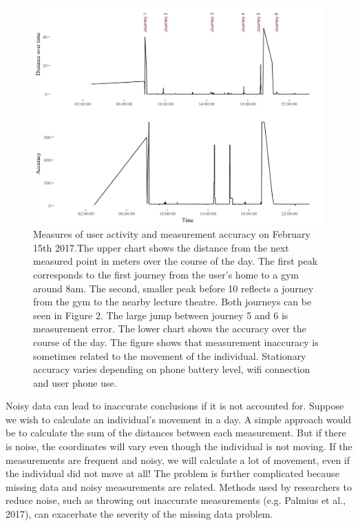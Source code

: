 \documentclass[man]{apa6}
\theoremstyle{definition}
\theoremstyle{definition}
\theoremstyle{definition}
\theoremstyle{remark}
\begin{document}
\begin{figure}
\includegraphics[width=1\linewidth]{img/accuracyLocShift} \caption{Measures of user activity and measurement accuracy on February 15th 2017.The upper chart shows the distance from the next measured point in meters over the course of the day. The first peak corresponds to the first journey from the user's home to a gym around 8am. The second, smaller peak before 10 reflects a journey from the gym to the nearby lecture theatre. Both journeys can be seen in Figure 2. The large jump between journey 5 and 6 is measurement error. The lower chart shows the accuracy over the course of the day. The figure shows that measurement inaccuracy is sometimes related to the movement of the individual. Stationary accuracy varies depending on phone battery level, wifi connection and user phone use.}\label{fig:accuracyPlot2}
\end{figure}

Noisy data can lead to inaccurate conclusions if it is not accounted
for. Suppose we wish to calculate an individual's movement in a day. A
simple approach would be to calculate the sum of the distances between
each measurement. But if there is noise, the coordinates will vary even
though the individual is not moving. If the measurements are frequent
and noisy, we will calculate a lot of movement, even if the individual
did not move at all! The problem is further complicated because missing
data and noisy measurements are related. Methods used by researchers to
reduce noise, such as throwing out inaccurate measurements (e.g. Palmius
et al., 2017), can exacerbate the severity of the missing data problem.
\end{document}
